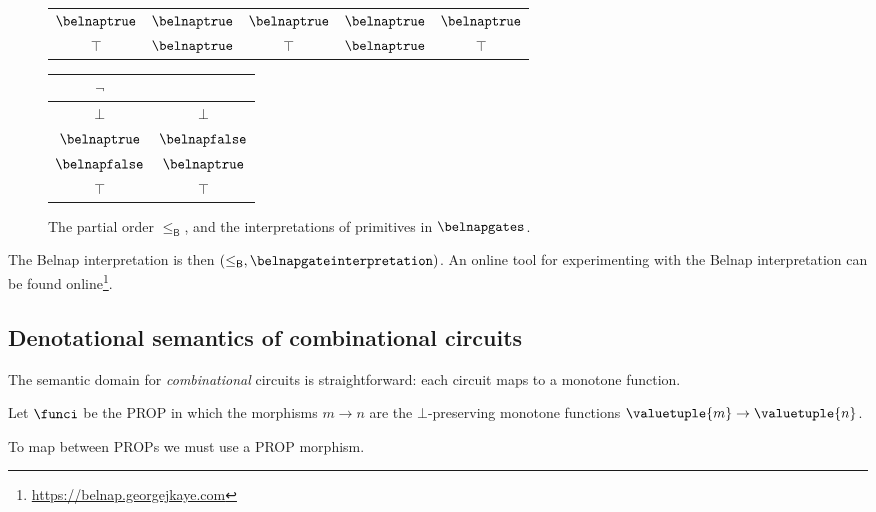 \documentclass{lmcs}
\begin{document}
\begin{exa}
\begin{figure*}
\begin{tabular}{|c|cccc|}
            \(\belnaptrue\)  & \(\belnaptrue\) & \(\belnaptrue\)  & \(\belnaptrue\) & \(\belnaptrue\) \\
            \(\top\)         & \(\belnaptrue\) & \(\top\)         & \(\belnaptrue\) & \(\top\)        \\
            \hline
        \end{tabular}
        \quad
        \begin{tabular}{|c|c|}
            \hline
            \(\neg\)         &                  \\
            \hline
            \(\bot\)         & \(\bot\)         \\
            \(\belnaptrue\)  & \(\belnapfalse\) \\
            \(\belnapfalse\) & \(\belnaptrue\)  \\
            \(\top\)         & \(\top\)         \\
            \hline
        \end{tabular}
        \caption{
            The partial order \(\leq_\mathsf{B}\), and the interpretations
            of primitives in \(\belnapgates\).
        }
        \label{fig:belnap-interpretation}
    \end{figure*}

    The Belnap interpretation is then \(
    (\leq_\mathsf{B}, \belnapgateinterpretation)
    \).
    An online tool for experimenting with the Belnap interpretation can be found
    online\footnote{\url{https://belnap.georgejkaye.com}}.
\end{exa}
\subsection{Denotational semantics of combinational circuits}

The semantic domain for \emph{combinational} circuits is straightforward: each
circuit maps to a monotone function.

\begin{defi}
    Let \(\funci\) be the PROP in which the morphisms
    \(m \to n\) are the \(\bot\)-preserving monotone
    functions \(\valuetuple{m} \to \valuetuple{n}\).
\end{defi}

To map between PROPs we must use a PROP morphism.
\end{document}
